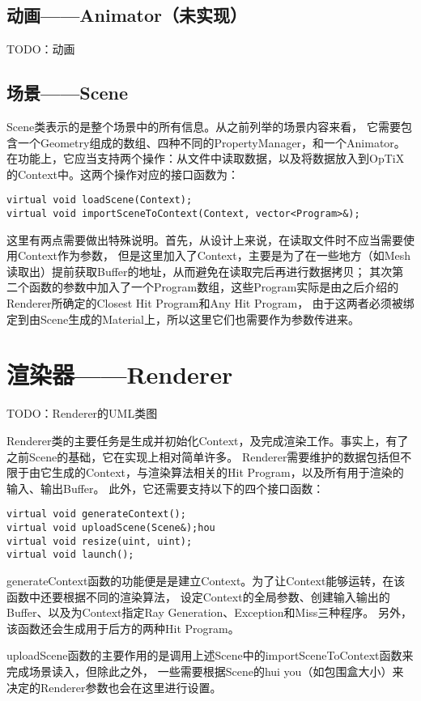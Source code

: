 \subsection{动画——Animator（未实现）}
TODO：动画

\subsection{场景——Scene}
Scene类表示的是整个场景中的所有信息。从之前列举的场景内容来看，
它需要包含一个Geometry组成的数组、四种不同的PropertyManager，和一个Animator。
在功能上，它应当支持两个操作：从文件中读取数据，以及将数据放入到OpTiX的Context中。这两个操作对应的接口函数为：
\lstset{language=C++}
\begin{lstlisting}
virtual void loadScene(Context);
virtual void importSceneToContext(Context, vector<Program>&);
\end{lstlisting}

这里有两点需要做出特殊说明。首先，从设计上来说，在读取文件时不应当需要使用Context作为参数，
但是这里加入了Context，主要是为了在一些地方（如Mesh读取出）提前获取Buffer的地址，从而避免在读取完后再进行数据拷贝；
其次第二个函数的参数中加入了一个Program数组，这些Program实际是由之后介绍的Renderer所确定的Closest Hit Program和Any Hit Program，
由于这两者必须被绑定到由Scene生成的Material上，所以这里它们也需要作为参数传进来。

\section{渲染器——Renderer}
TODO：Renderer的UML类图

Renderer类的主要任务是生成并初始化Context，及完成渲染工作。事实上，有了之前Scene的基础，它在实现上相对简单许多。
Renderer需要维护的数据包括但不限于由它生成的Context，与渲染算法相关的Hit Program，以及所有用于渲染的输入、输出Buffer。
此外，它还需要支持以下的四个接口函数：

\lstset{language=C++}
\begin{lstlisting}
virtual void generateContext();
virtual void uploadScene(Scene&);hou
virtual void resize(uint, uint);
virtual void launch();
\end{lstlisting}

generateContext函数的功能便是是建立Context。为了让Context能够运转，在该函数中还要根据不同的渲染算法，
设定Context的全局参数、创建输入输出的Buffer、以及为Context指定Ray Generation、Exception和Miss三种程序。
另外，该函数还会生成用于后方的两种Hit Program。

uploadScene函数的主要作用的是调用上述Scene中的importSceneToContext函数来完成场景读入，但除此之外，
一些需要根据Scene的hui you（如包围盒大小）来决定的Renderer参数也会在这里进行设置。

